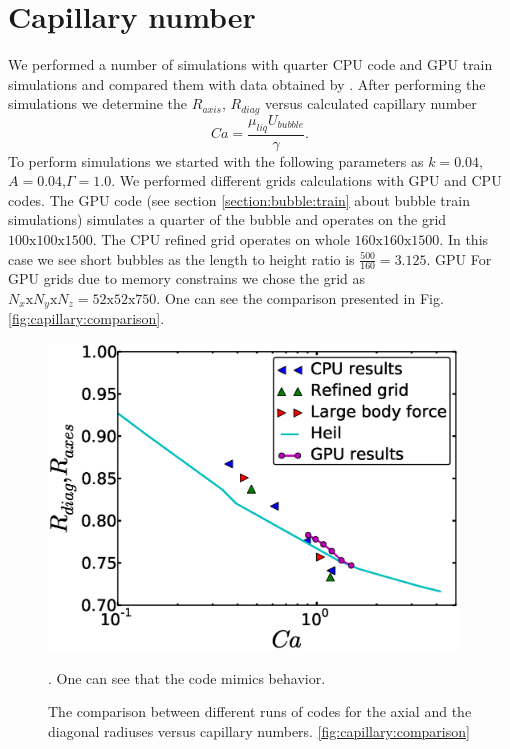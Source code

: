 \documentclass{article}
\begin{document}
\section{Capillary number}
We performed a number of simulations with quarter CPU code and GPU train simulations and compared
them with data obtained by \cite{heil-threedim}. After performing the simulations we determine the
$R_{axis}$, $R_{diag}$ versus calculated
capillary number
\begin{equation}
Ca=\frac{\mu_{liq} U_{bubble}}{\gamma}.
\end{equation}
To perform simulations we
started with the following parameters as
$k=0.04$,$A=0.04$,$\Gamma=1.0$. We performed different grids calculations with GPU and CPU codes.
The GPU code (see section \ref{section:bubble:train} about bubble train simulations) simulates a
quarter of the bubble and operates on the grid $100\mathrm{x}100\mathrm{x}1500$. The CPU refined
grid operates on whole $160\mathrm{x}160\mathrm{x}1500$. In this case we see short bubbles as the
length to height ratio is $\frac{500}{160}=3.125$. GPU  For GPU grids due to memory constrains we
chose the grid as $N_x\mathrm{x}N_y\mathrm{x}N_z=52\mathrm{x}52\mathrm{x}750$. One can see the
comparison presented in Fig. \ref{fig:capillary:comparison}.
\begin{figure}
\includegraphics[width=0.97\textwidth]{Figures/capillaries_comparison.eps}
\caption{The comparison between different runs of codes for the axial and the diagonal radiuses
versus capillary numbers. \ref{fig:capillary:comparison}}. One can see that the code mimics
behavior.
\end{figure}
\end{document}
